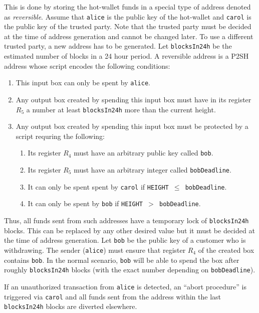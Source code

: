 \documentclass[11pt]{article}
\begin{document}
This is done by storing the hot-wallet funds in a special type of address denoted as {\em reversible}. Assume that \texttt{alice} is the public key of the hot-wallet and \texttt{carol} is the public key of the trusted party. Note that the trusted party must be decided at the time of address generation and cannot be changed later. To use a different trusted party, a new address has to be generated. Let \texttt{blocksIn24h} be the estimated number of blocks in a 24 hour period. A reversible address is a P2SH
address whose script encodes the following conditions:   
\begin{enumerate}
	\item This input box can only be spent by \texttt{alice}.
	\item Any output box created by spending this input box must have in its register $R_5$ a number at least \texttt{blocksIn24h} more than the current height. 
	\item Any output box created by spending this input box must be protected by a script requring the following: 	
	\begin{enumerate}
		\item Its register $R_4$ must have an arbitrary public key called \texttt{bob}.
		\item Its register $R_5$ must have an arbitrary integer called \texttt{bobDeadline}.
		\item It can only be spent spent by \texttt{carol} if \texttt{HEIGHT $\leq$ bobDeadline}.
		\item It can only be spent by \texttt{bob} if \texttt{HEIGHT $>$ bobDeadline}.
	\end{enumerate}  
\end{enumerate}

Thus, all funds sent from such addresses have a temporary lock of \texttt{blocksIn24h} blocks. This can be replaced by any other desired value but it must be decided at the time of address generation. 
Let \texttt{bob} be the public key of a customer who is withdrawing. The sender (\texttt{alice}) must ensure that register $R_4$ of the created box contains \texttt{bob}. In the normal scenario, \texttt{bob} will be able to spend the box after roughly \texttt{blocksIn24h} blocks (with the exact number depending on \texttt{bobDeadline}). 

If an unauthorized transaction from \texttt{alice} is detected, an ``abort procedure'' is triggered via \texttt{carol} and all funds sent from the address within the last \texttt{blocksIn24h} blocks are diverted elsewhere. %
\end{document}
